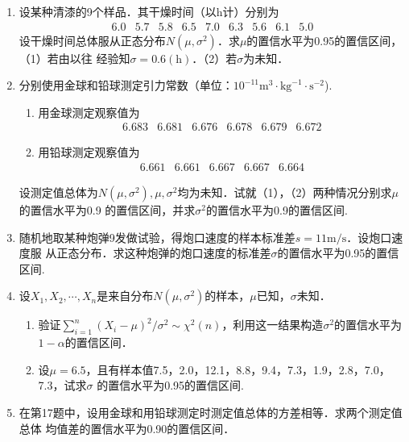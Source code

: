 \documentclass[10pt,a4paper]{article}
\begin{document}
\begin{enumerate}
    \item 设某种清漆的9个样品．其干燥时间（以h计）分别为
    $$\begin{array}{ccccccccc}
        6.0 & 5.7 & 5.8 & 6.5 & 7.0 & 6.3 & 5.6 & 6.1 & 5.0
    \end{array}$$
    设干燥时间总体服从正态分布$N(\mu,\sigma^2)$．求$\mu$的置信水平为0.95的置信区间，（1）若由以往
    经验知$\sigma=0.6(\mathrm{h})$．（2）若$\sigma$为未知．




    \item 分别使用金球和铅球测定引力常数（单位：$10^{-11}\mathrm{m}^3\cdot\mathrm{kg}^{-1}\cdot\mathrm{s}^{-2}$).
    \begin{enumerate}
        \item 用金球测定观察值为
        $$\begin{array}{cccccc}
            6.683 & 6.681 & 6.676 & 6.678 & 6.679 & 6.672
        \end{array}$$
        \item 用铅球测定观察值为
        $$\begin{array}{ccccc}
            6.661 & 6.661 & 6.667 & 6.667 & 6.664 
        \end{array}$$
    \end{enumerate}
    设测定值总体为$N(\mu,\sigma^2),\mu,\sigma^2$均为未知．试就（1），（2）两种情况分别求$\mu$的置信水平为0.9
    的置信区间，并求$\sigma^2$的置信水平为0.9的置信区间.




    \item 随机地取某种炮弹9发做试验，得炮口速度的样本标准差$s=11\mathrm{m}/\mathrm{s}$．设炮口速度服
    从正态分布．求这种炮弹的炮口速度的标准差$\sigma$的置信水平为0.95的置信区间.




    \item 设$X_1,X_2,\cdots,X_n$是来自分布$N(\mu,\sigma^2)$的样本，$\mu$已知，$\sigma$未知．
    \begin{enumerate}
        \item 验证$\displaystyle{\sum_{i=1}^n (X_i-\mu)^2/\sigma^2}\sim \chi^2(n)$，利用这一结果构造$\sigma^2$的置信水平为$1-\alpha$的置信区间．
        \item 设$\mu=6.5$，且有样本值7.5，2.0，12.1，8.8，9.4，7.3，1.9，2.8，7.0，7.3，试求$\sigma$
        的置信水平为0.95的置信区间.
    \end{enumerate}



    \item 在第17题中，设用金球和用铅球测定时测定值总体的方差相等．求两个测定值总体
    均值差的置信水平为0.90的置信区间．





\end{enumerate}
\end{document}
